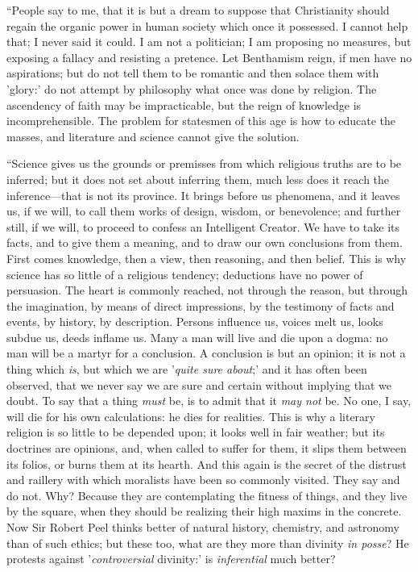 ``People say to me, that it is but a dream to suppose that
Christianity should regain the organic power in human society which
once it possessed. I cannot help that; I never said it could. I am not
a politician; I am proposing no measures, but exposing a fallacy and
resisting a pretence. Let Benthamism reign, if men have no
aspirations; but do not tell them to be romantic and then solace them
with 'glory:' do not attempt by philosophy what once was done by
religion. The ascendency of faith may be impracticable, but the reign
of knowledge is incomprehensible. The problem for statesmen of this
age is how to educate the masses, and literature and science cannot
give the solution.

``Science gives us the grounds or premisses from which
religious truths are to be inferred; but it does not set about
inferring them, much less does it reach the inference—that is not
its province. It brings before us phenomena, and it leaves us, if we
will, to call them works of design, wisdom, or benevolence; and
further still, if we will, to proceed to confess an Intelligent
Creator. We have to take its facts, and to give them a meaning, and to
draw our own conclusions from them. First comes knowledge, then a
view, then reasoning, and then belief. This is why science has so
little of a religious tendency; deductions have no power of
persuasion. The heart is commonly reached, not through the reason, but
through the imagination, by means of direct impressions, by the
testimony of facts and events, by history, by description.
Persons influence us, voices melt us, looks subdue us, deeds inflame
us. Many a man will live and die upon a dogma: no man will be a martyr
for a conclusion. A conclusion is but an opinion; it is not a thing
which \emph{is}, but which we are '\emph{quite sure about};' and it
has often been observed, that we never say we are sure and certain
without implying that we doubt. To say that a thing \emph{must} be, is to
admit that it \emph{may not} be. No one, I say, will die for his own
calculations: he dies for realities. This is why a literary religion
is so little to be depended upon; it looks well in fair weather; but
its doctrines are opinions, and, when called to suffer for them, it
slips them between its folios, or burns them at its hearth. And this
again is the secret of the distrust and raillery with which moralists
have been so commonly visited. They say and do not. Why? Because they
are contemplating the fitness of things, and they live by the square,
when they should be realizing their high maxims in the concrete. Now
Sir Robert Peel thinks better of natural history, chemistry, and
astronomy than of such ethics; but these too, what are they more than
divinity \emph{in posse}? He protests against '\emph{controversial}
divinity:' is \emph{inferential} much better?

